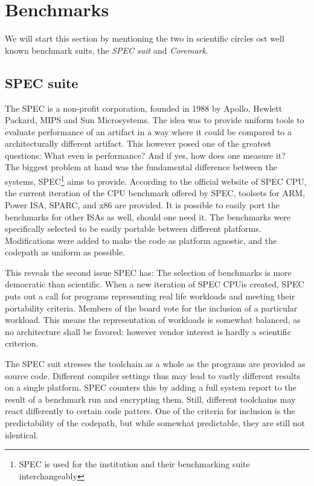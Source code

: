 \documentclass[../bachelor_paper.tex]{subfiles}
\begin{document}
\section{Benchmarks}
    \label{ch:theo/benc}
We will start this section by mentioning the two in scientific circles ost well known benchmark suits, the \emph{SPEC suit} and \emph{Coremark}.

\subsection{SPEC suite}
    \label{ch:theo/benc/spec}
The \ac{SPEC} is a non-profit corporation, founded in 1988 by Apollo, Hewlett Packard, MIPS and Sun Microsystems. \cite{dixitSPECBenchmarks1991} The idea was to provide uniform tools to evaluate performance of an artifact in a way where it could be compared to a architecturally different artifact. This however posed one of the greatest questions: What even is performance? And  if yes, how does one measure it?\\
The biggest problem at hand was the fundamental difference between the systems, \ac{SPEC}\footnote{\ac{SPEC} is used for the institution and their benchmarking suite interchangeably} aims to provide. According to the official website of \ac{SPEC} CPU, the current iteration of the CPU benchmark offered by \ac{SPEC}, toolsets for ARM, Power ISA, SPARC, and x86 are provided. It is possible to easily port the benchmarks for other \ac{ISA}s as well, should one need it. The benchmarks were specifically selected to be easily portable between different platforms. Modifications were added to make the code as platform agnostic, and the codepath as uniform as possible.

This reveals the second issue \ac{SPEC} has: The selection of benchmarks is more democratic than scientific. When a new iteration of \ac{SPEC} CPU\rsym is created, \ac{SPEC} puts out a call for programs representing real life workloads and meeting their portability criteria. Members of the board vote for the inclusion of a particular workload. \cite{henningSPECCPU2000Measuring2000} This means the representation of workloads is somewhat balanced, as no architecture shall be favored; however vendor interest is hardly a scientific criterion. 

The \ac{SPEC} suit stresses the toolchain as a whole as the programs are provided as source code. Different compiler settings thus may lead to vastly different results on a single platform. \ac{SPEC} counters this by adding a full system report to the result of a benchmark run and encrypting them. \cite{bucekSPECCPU2017NextGeneration2018} Still, different toolchains may react differently to certain code patters. One of the criteria for inclusion is the predictability of the codepath, but while somewhat predictable, they are still not identical. 
\end{document}
